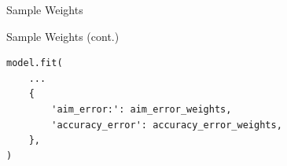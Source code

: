 \documentclass[table]{beamer}
\begin{document}
\begin{frame}{Sample Weights}

\end{frame}

\begin{frame}[fragile]{Sample Weights (cont.)}
  \begin{verbatim}
model.fit(
    ...
    {
        'aim_error:': aim_error_weights,
        'accuracy_error': accuracy_error_weights,
    },
)
  \end{verbatim}
\end{frame}
\end{document}
